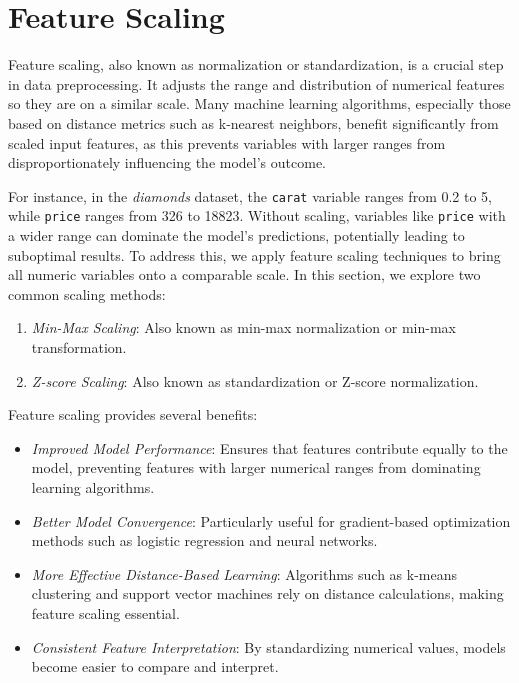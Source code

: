 \documentclass[
]{book}
\newcommand{\passthrough}[1]{#1}
\providecommand{\tightlist}{%
  \setlength{\itemsep}{0pt}\setlength{\parskip}{0pt}}
\theoremstyle{definition}
\theoremstyle{definition}
\theoremstyle{definition}
\theoremstyle{definition}
\theoremstyle{remark}
\begin{document}
\section{Feature Scaling}\label{feature-scaling}

Feature scaling, also known as normalization or standardization, is a crucial step in data preprocessing. It adjusts the range and distribution of numerical features so they are on a similar scale. Many machine learning algorithms, especially those based on distance metrics such as k-nearest neighbors, benefit significantly from scaled input features, as this prevents variables with larger ranges from disproportionately influencing the model's outcome.

For instance, in the \emph{diamonds} dataset, the \passthrough{\lstinline!carat!} variable ranges from 0.2 to 5, while \passthrough{\lstinline!price!} ranges from 326 to 18823. Without scaling, variables like \passthrough{\lstinline!price!} with a wider range can dominate the model's predictions, potentially leading to suboptimal results. To address this, we apply feature scaling techniques to bring all numeric variables onto a comparable scale. In this section, we explore two common scaling methods:

\begin{enumerate}
\def\labelenumi{\arabic{enumi}.}
\tightlist
\item
  \emph{Min-Max Scaling}: Also known as min-max normalization or min-max transformation.
\item
  \emph{Z-score Scaling}: Also known as standardization or Z-score normalization.
\end{enumerate}

Feature scaling provides several benefits:

\begin{itemize}
\tightlist
\item
  \emph{Improved Model Performance}: Ensures that features contribute equally to the model, preventing features with larger numerical ranges from dominating learning algorithms.
\item
  \emph{Better Model Convergence}: Particularly useful for gradient-based optimization methods such as logistic regression and neural networks.
\item
  \emph{More Effective Distance-Based Learning}: Algorithms such as k-means clustering and support vector machines rely on distance calculations, making feature scaling essential.
\item
  \emph{Consistent Feature Interpretation}: By standardizing numerical values, models become easier to compare and interpret.
\end{itemize}
\end{document}
